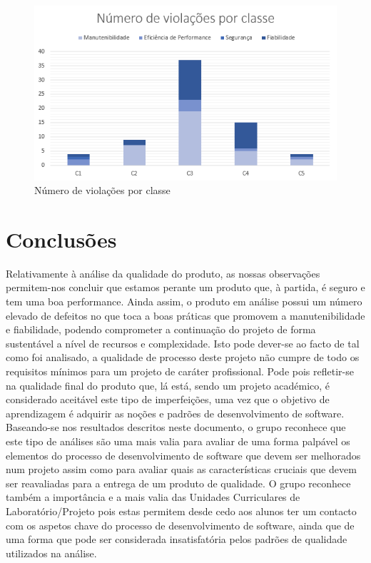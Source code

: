 \documentclass[openany,10pt,a4paper]{article}
\begin{document}
\begin{figure}[H]
	\centering
	\includegraphics[width=0.7\linewidth]{chart_classes.PNG}
\caption{Número de violações por classe \small}
	\label{figClass}
\end{figure}

\section{Conclusões}
Relativamente à análise da qualidade do produto, as nossas observações permitem-nos concluir que estamos perante um produto que, à partida, é seguro e tem uma boa performance. Ainda assim, o produto em análise possui um número elevado de defeitos no que toca a boas práticas que promovem a manutenibilidade e fiabilidade, podendo comprometer a continuação do projeto de forma sustentável a nível de recursos e complexidade. 
Isto pode dever-se ao facto de tal como foi analisado, a qualidade de processo deste projeto não cumpre de todo os requisitos mínimos para um projeto de caráter profissional. Pode pois refletir-se na qualidade final do produto que, lá está, sendo um projeto académico, é considerado aceitável este tipo de imperfeições, uma vez que o objetivo de aprendizagem é adquirir as noções e padrões de desenvolvimento de software. \\
Baseando-se nos resultados descritos neste documento, o grupo reconhece que este tipo de análises são uma mais valia para avaliar de uma forma palpável os elementos do processo de desenvolvimento de software que devem ser melhorados num projeto assim como para avaliar quais as características cruciais que devem ser reavaliadas para a entrega de um produto de qualidade. O grupo reconhece também a importância e a mais valia das Unidades Curriculares de Laboratório/Projeto pois estas permitem desde cedo aos alunos ter um contacto com os aspetos chave do processo de desenvolvimento de software, ainda que de uma forma que pode ser considerada insatisfatória pelos padrões de qualidade utilizados na análise.
\end{document}
